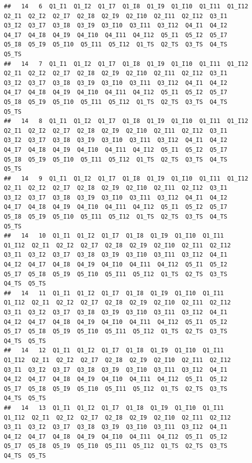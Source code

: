 \documentclass[]{book}
\begin{document}
\begin{verbatim}
##   14   6  Q1_I1  Q1_I2  Q1_I7  Q1_I8  Q1_I9  Q1_I10  Q1_I11  Q1_I12  Q2_I1  Q2_I2  Q2_I7  Q2_I8  Q2_I9  Q2_I10  Q2_I11  Q2_I12  Q3_I1  Q3_I2  Q3_I7  Q3_I8  Q3_I9  Q3_I10  Q3_I11  Q3_I12  Q4_I1  Q4_I2  Q4_I7  Q4_I8  Q4_I9  Q4_I10  Q4_I11  Q4_I12  Q5_I1  Q5_I2  Q5_I7  Q5_I8  Q5_I9  Q5_I10  Q5_I11  Q5_I12  Q1_TS  Q2_TS  Q3_TS  Q4_TS  Q5_TS
##   14   7  Q1_I1  Q1_I2  Q1_I7  Q1_I8  Q1_I9  Q1_I10  Q1_I11  Q1_I12  Q2_I1  Q2_I2  Q2_I7  Q2_I8  Q2_I9  Q2_I10  Q2_I11  Q2_I12  Q3_I1  Q3_I2  Q3_I7  Q3_I8  Q3_I9  Q3_I10  Q3_I11  Q3_I12  Q4_I1  Q4_I2  Q4_I7  Q4_I8  Q4_I9  Q4_I10  Q4_I11  Q4_I12  Q5_I1  Q5_I2  Q5_I7  Q5_I8  Q5_I9  Q5_I10  Q5_I11  Q5_I12  Q1_TS  Q2_TS  Q3_TS  Q4_TS  Q5_TS
##   14   8  Q1_I1  Q1_I2  Q1_I7  Q1_I8  Q1_I9  Q1_I10  Q1_I11  Q1_I12  Q2_I1  Q2_I2  Q2_I7  Q2_I8  Q2_I9  Q2_I10  Q2_I11  Q2_I12  Q3_I1  Q3_I2  Q3_I7  Q3_I8  Q3_I9  Q3_I10  Q3_I11  Q3_I12  Q4_I1  Q4_I2  Q4_I7  Q4_I8  Q4_I9  Q4_I10  Q4_I11  Q4_I12  Q5_I1  Q5_I2  Q5_I7  Q5_I8  Q5_I9  Q5_I10  Q5_I11  Q5_I12  Q1_TS  Q2_TS  Q3_TS  Q4_TS  Q5_TS
##   14   9  Q1_I1  Q1_I2  Q1_I7  Q1_I8  Q1_I9  Q1_I10  Q1_I11  Q1_I12  Q2_I1  Q2_I2  Q2_I7  Q2_I8  Q2_I9  Q2_I10  Q2_I11  Q2_I12  Q3_I1  Q3_I2  Q3_I7  Q3_I8  Q3_I9  Q3_I10  Q3_I11  Q3_I12  Q4_I1  Q4_I2  Q4_I7  Q4_I8  Q4_I9  Q4_I10  Q4_I11  Q4_I12  Q5_I1  Q5_I2  Q5_I7  Q5_I8  Q5_I9  Q5_I10  Q5_I11  Q5_I12  Q1_TS  Q2_TS  Q3_TS  Q4_TS  Q5_TS
##   14   10  Q1_I1  Q1_I2  Q1_I7  Q1_I8  Q1_I9  Q1_I10  Q1_I11  Q1_I12  Q2_I1  Q2_I2  Q2_I7  Q2_I8  Q2_I9  Q2_I10  Q2_I11  Q2_I12  Q3_I1  Q3_I2  Q3_I7  Q3_I8  Q3_I9  Q3_I10  Q3_I11  Q3_I12  Q4_I1  Q4_I2  Q4_I7  Q4_I8  Q4_I9  Q4_I10  Q4_I11  Q4_I12  Q5_I1  Q5_I2  Q5_I7  Q5_I8  Q5_I9  Q5_I10  Q5_I11  Q5_I12  Q1_TS  Q2_TS  Q3_TS  Q4_TS  Q5_TS
##   14   11  Q1_I1  Q1_I2  Q1_I7  Q1_I8  Q1_I9  Q1_I10  Q1_I11  Q1_I12  Q2_I1  Q2_I2  Q2_I7  Q2_I8  Q2_I9  Q2_I10  Q2_I11  Q2_I12  Q3_I1  Q3_I2  Q3_I7  Q3_I8  Q3_I9  Q3_I10  Q3_I11  Q3_I12  Q4_I1  Q4_I2  Q4_I7  Q4_I8  Q4_I9  Q4_I10  Q4_I11  Q4_I12  Q5_I1  Q5_I2  Q5_I7  Q5_I8  Q5_I9  Q5_I10  Q5_I11  Q5_I12  Q1_TS  Q2_TS  Q3_TS  Q4_TS  Q5_TS
##   14   12  Q1_I1  Q1_I2  Q1_I7  Q1_I8  Q1_I9  Q1_I10  Q1_I11  Q1_I12  Q2_I1  Q2_I2  Q2_I7  Q2_I8  Q2_I9  Q2_I10  Q2_I11  Q2_I12  Q3_I1  Q3_I2  Q3_I7  Q3_I8  Q3_I9  Q3_I10  Q3_I11  Q3_I12  Q4_I1  Q4_I2  Q4_I7  Q4_I8  Q4_I9  Q4_I10  Q4_I11  Q4_I12  Q5_I1  Q5_I2  Q5_I7  Q5_I8  Q5_I9  Q5_I10  Q5_I11  Q5_I12  Q1_TS  Q2_TS  Q3_TS  Q4_TS  Q5_TS
##   14   13  Q1_I1  Q1_I2  Q1_I7  Q1_I8  Q1_I9  Q1_I10  Q1_I11  Q1_I12  Q2_I1  Q2_I2  Q2_I7  Q2_I8  Q2_I9  Q2_I10  Q2_I11  Q2_I12  Q3_I1  Q3_I2  Q3_I7  Q3_I8  Q3_I9  Q3_I10  Q3_I11  Q3_I12  Q4_I1  Q4_I2  Q4_I7  Q4_I8  Q4_I9  Q4_I10  Q4_I11  Q4_I12  Q5_I1  Q5_I2  Q5_I7  Q5_I8  Q5_I9  Q5_I10  Q5_I11  Q5_I12  Q1_TS  Q2_TS  Q3_TS  Q4_TS  Q5_TS

\end{verbatim}
\end{document}
